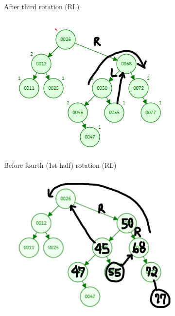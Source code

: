 \documentclass[12pt, a4paper]{article}
\begin{document}
\begin{enumerate}
\begin{figure}[h!]
\begin{subfigure}[b]{0.3\textwidth}
        \caption{After third rotation (RL)}
        \label{fig:1-3-b}
      \end{subfigure}
      \hfill
      \begin{subfigure}[b]{0.3\textwidth}
        \centering
        \includegraphics[width=\textwidth]{1-4-a}
        \caption{Before fourth (1st half) rotation (RL)}
        \label{fig:1-4-a}
      \end{subfigure}
      \hfill
      \begin{subfigure}[b]{0.3\textwidth}
        \centering
        \includegraphics[width=\textwidth]{1-4-b}

\end{subfigure}
\end{figure}
\end{enumerate}
\end{document}
